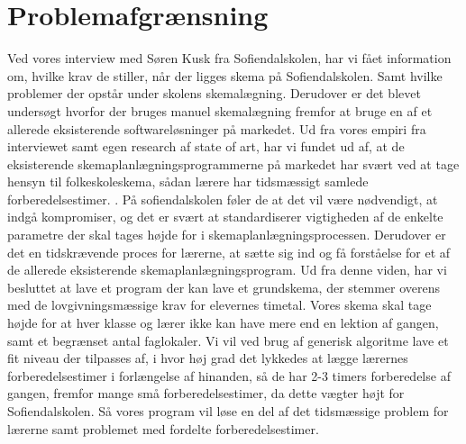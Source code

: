 \section{Problemafgrænsning}
Ved vores interview med Søren Kusk fra Sofiendalskolen, har vi fået information om, hvilke krav de stiller, når der ligges skema på Sofiendalskolen. Samt hvilke problemer der opstår under skolens skemalægning. Derudover er det blevet undersøgt hvorfor der bruges manuel skemalægning fremfor at bruge en af et allerede eksisterende softwareløsninger på markedet.
Ud fra vores empiri fra interviewet samt egen research af state of art, har vi fundet ud af, at de eksisterende skemaplanlægningsprogrammerne på markedet har svært ved at tage hensyn til folkeskoleskema, sådan lærere har tidsmæssigt samlede forberedelsestimer.
. På sofiendalskolen føler de at det vil være nødvendigt, at indgå kompromiser, og det er svært at standardiserer vigtigheden af de enkelte parametre der skal tages højde for i skemaplanlægningsprocessen. Derudover er det en tidskrævende proces for lærerne, at sætte sig ind og få forståelse for et af de allerede eksisterende skemaplanlægningsprogram.
Ud fra denne viden, har vi besluttet at lave et program der kan lave et grundskema, der stemmer overens med de lovgivningsmæssige krav for elevernes timetal. Vores skema skal tage højde for at hver klasse og lærer ikke kan have mere end en lektion af gangen, samt et begrænset antal faglokaler. Vi vil ved brug af generisk algoritme lave et fit niveau der tilpasses af, i hvor høj grad det lykkedes at lægge lærernes forberedelsestimer i forlængelse af hinanden, så de har 2-3 timers forberedelse af gangen, fremfor mange små forberedelsestimer, da dette vægter højt for Sofiendalskolen.
Så vores program vil løse en del af det tidsmæssige problem for lærerne samt problemet med fordelte forberedelsestimer.